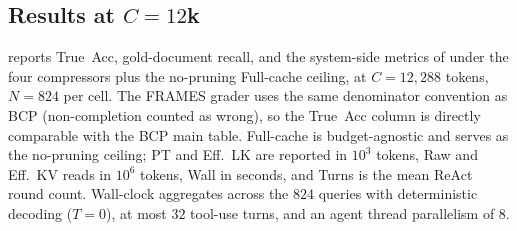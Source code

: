 \documentclass[11pt]{article}
\begin{document}
\subsection{Results at \texorpdfstring{$C{=}12$k}{C=12k}}
\label{appendix:frames-results}

 reports True~Acc, gold-document recall, and
the system-side metrics of  under the
four compressors plus the no-pruning Full-cache ceiling, at
$C\!=\!12{,}288$ tokens, $N\!=\!824$ per cell. The FRAMES grader
uses the same denominator convention as BCP (non-completion counted
as wrong), so the True~Acc column is directly comparable with the
BCP main table. Full-cache is budget-agnostic and serves as the
no-pruning ceiling; PT and Eff.~LK are reported in $10^3$ tokens,
Raw and Eff.~KV reads in $10^6$ tokens, Wall in seconds, and Turns
is the mean ReAct round count. Wall-clock aggregates across the
$824$ queries with deterministic decoding ($T{=}0$), at most $32$
tool-use turns, and an agent thread parallelism of $8$.
\end{document}
